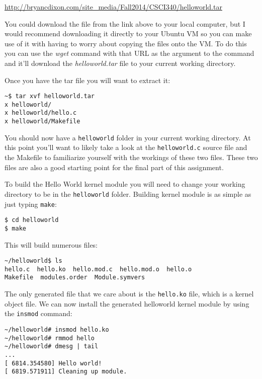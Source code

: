 \documentclass[11pt]{article}
\begin{document}
{\url{http://bryancdixon.com/site_media/Fall2014/CSCI340/helloworld.tar}}

You could download the file from the link above to your local computer, but I would recommend downloading it directly to your Ubuntu VM so you can make use of it with having to worry about copying the files onto the VM. To do this you can use the {\it wget} command with that URL as the argument to the command and it'll download the {\it helloworld.tar} file to your current working directory.

Once you have the tar file you will want to extract it:

\begin{verbatim}
~$ tar xvf helloworld.tar
x helloworld/
x helloworld/hello.c
x helloworld/Makefile
\end{verbatim}

You should now have a \texttt{helloworld} folder in your current working directory. At this point you'll want to likely take a look at the \texttt{helloworld.c} source file and the Makefile to familiarize yourself with the workings of these two files. These two files are also a good starting point for the final part of this assignment. 

To build the Hello World kernel module you will need to change your working directory to be in the \texttt{helloworld} folder. Building kernel module is as simple as just typing \texttt{make}:

\begin{verbatim}
$ cd helloworld
$ make
\end{verbatim}

\newpage

This will build numerous files:

\begin{verbatim}
~/helloworld$ ls
hello.c  hello.ko  hello.mod.c  hello.mod.o  hello.o  
Makefile  modules.order  Module.symvers
\end{verbatim}

The only generated file that we care about is the \texttt{hello.ko} file, which is a kernel object file. We can now install the generated helloworld kernel module by using the \texttt{insmod} command:

\begin{verbatim}
~/helloworld# insmod hello.ko
~/helloworld# rmmod hello
~/helloworld# dmesg | tail
...
[ 6814.354580] Hello world!
[ 6819.571911] Cleaning up module.
\end{verbatim}
\end{document}

